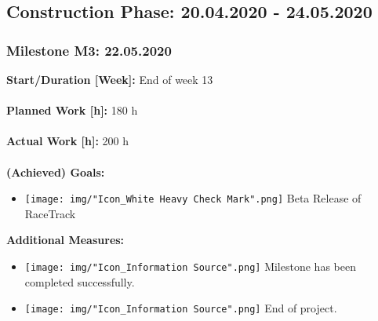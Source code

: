 		\newpage

		\subsection{Construction Phase: 20.04.2020 - 24.05.2020}

			\subsubsection{Milestone M3: 22.05.2020}
				\textbf{Start/Duration [Week]:} End of week 13 \\~\\
				\textbf{Planned Work [h]:} 180 h \\~\\
				\textbf{Actual Work [h]:} 200 h \\~\\
				\textbf{(Achieved) Goals:}
				\begin{itemize}
					\item \texttt{[image: img/"Icon\_White Heavy Check Mark".png]} Beta Release of RaceTrack
				\end{itemize}
				\textbf{Additional Measures:}
				\begin{itemize}
					\item \texttt{[image: img/"Icon\_Information Source".png]} Milestone has been completed successfully.
					\item \texttt{[image: img/"Icon\_Information Source".png]} End of project.
				\end{itemize}


